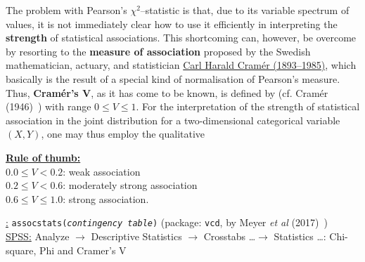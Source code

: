 \medskip
\noindent
The problem with Pearson's $\chi^{2}$--statistic is that, due to 
its variable spectrum of values, it is not immediately clear how 
to use it efficiently in interpreting the \textbf{strength} of 
statistical associations. This shortcoming can, however, be 
overcome by resorting to the \textbf{measure of association}
proposed by the Swedish mathematician, actuary, and statistician 
\href{http://www-history.mcs.st-and.ac.uk/Biographies/Cramer_Harald.html}{Carl
Harald Cram\'{e}r (1893--1985)}, which basically is the 
result of a special kind of normalisation of Pearson's measure. 
Thus, \textbf{Cram\'{e}r's $\boldsymbol{V}$}, as it has come to be 
known, is defined by (cf. Cram\'{e}r (1946)~)
%
\be
{}
\ee
%
with range $0 \leq V \leq 1$. For the interpretation of the 
strength of statistical association in the joint distribution for a 
two-dimensional categorical variable~$(X,Y)$, one may thus employ 
the qualitative

\medskip
\noindent
\underline{\textbf{Rule of thumb:}}\\
$0.0 \leq V < 0.2$: weak association\\
$0.2 \leq V < 0.6$: moderately strong association\\
$0.6 \leq V \leq 1.0$: strong association.

\medskip
\noindent
\underline{\R:} \texttt{assocstats(\textit{contingency table})}
(package: \texttt{vcd}, by Meyer \textit{et al}
(2017)~) \\
\underline{SPSS:} Analyze $\rightarrow$ Descriptive Statistics
$\rightarrow$ Crosstabs \ldots $\rightarrow$ Statistics \ldots:
Chi-square, Phi and Cramer's V


